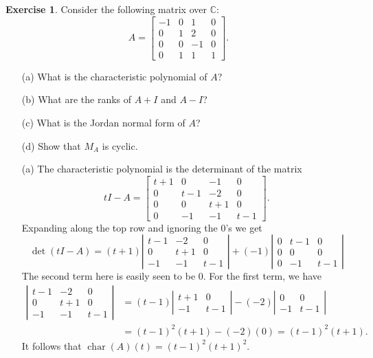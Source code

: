 \documentclass{amsart}
\newcommand{\bbm}       {\left[\begin{matrix}}
\newcommand{\ebm}       {\end{matrix}\right]}
\newcommand{\chr}       {\operatorname{char}}
\newcommand{\C}         {{\mathbb{C}}}
\newcommand{\ip}[1]     {\langle #1\rangle}
\renewcommand{\:}{\colon}
\theoremstyle{definition}
\newtheorem{exercise}{Exercise}[section]
\renewenvironment{solution}{\SolutionAtEnd}{\endSolutionAtEnd}
\begin{document}
\begin{exercise}
 Consider the following matrix over $\C$: 
 \[ A = \bbm -1&0&1&0 \\ 0&1&2&0 \\ 0&0&-1&0 \\ 0&1&1&1 \ebm. \]
 \begin{itemize}
  \item[(a)] What is the characteristic polynomial of $A$?
  \item[(b)] What are the ranks of $A+I$ and $A-I$?
  \item[(c)] What is the Jordan normal form of $A$?
  \item[(d)] Show that $M_A$ is cyclic.
 \end{itemize}
\end{exercise}
\begin{solution}
 \begin{itemize}
  \item[(a)] The characteristic polynomial is the determinant of the
   matrix 
   \[ tI - A =
       \bbm t+1 & 0   & -1  & 0 \\
            0   & t-1 & -2  & 0 \\
            0   & 0   & t+1 & 0 \\
            0   & -1  & -1  & t-1
       \ebm.
   \]
   Expanding along the top row and ignoring the $0$'s we get 
   \[ \det(tI-A) = 
       (t+1)\left| \begin{array}{ccc} 
             t-1 & -2 & 0 \\ 0 & t+1 & 0 \\ -1 & -1 & t-1 
            \end{array} \right| +
       (-1) \left| \begin{array}{ccc} 
             0 & t-1 & 0 \\ 0 & 0 & 0 \\ 0 & -1  & t-1 
            \end{array} \right|
   \]
   The second term here is easily seen to be $0$.  For the first term,
   we have
   \begin{align*}
    \left| \begin{array}{ccc} 
     t-1 & -2 & 0 \\ 0 & t+1 & 0 \\ -1 & -1 & t-1 
    \end{array} \right| &= 
    (t-1) \left|\begin{array}{cc}t+1&0\\-1&t-1\end{array}\right| -
    (-2) \left|\begin{array}{cc}0&0\\-1&t-1\end{array}\right| \\
    &= (t-1)^2(t+1)-(-2)(0) = (t-1)^2(t+1).
   \end{align*}
   It follows that $\chr(A)(t)=(t-1)^2(t+1)^2$.


\end{itemize}
\end{solution}
\end{document}
